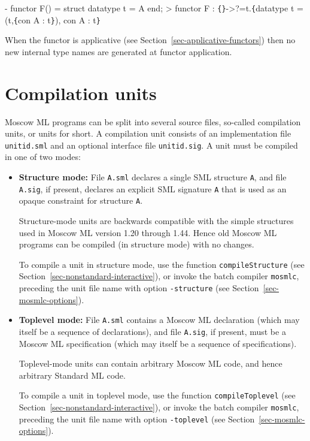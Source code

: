 \documentclass[fleqn,a4paper]{article}
\begin{document}
\begin{program}
- functor F() = struct datatype t = A end;
> functor F : \verb+{+\verb+}+->?=t.\verb+{+datatype t = (t,\verb+{+con A : t\verb+}+), con A : t\verb+}+
\end{program}

\noindent When the functor is applicative (see
Section~\ref{sec-applicative-functors}) then no new internal type
names are generated at functor application.

\newpage
\section{Compilation units}
\label{sec-compilation-units}

Moscow ML programs can be split into several source files, so-called
compilation units, or units for short.  A compilation unit consists of
an implementation file \texttt{unitid.sml} and an optional interface
file \texttt{unitid.sig}.  A unit must be compiled in one of two modes:

\begin{itemize}
\item \textbf{Structure mode:} File \texttt{A.sml} declares a single
  SML structure \texttt{A}, and file \texttt{A.sig}, if present,
  declares an explicit SML signature \texttt{A} that is used as an
  opaque constraint for structure \texttt{A}.

  
  Structure-mode units are backwards compatible with the simple
  structures used in Moscow ML version 1.20 through 1.44.  Hence old
  Moscow ML programs can be compiled (in structure mode) with no
  changes.
  
  To compile a unit in structure mode, use the function
  \texttt{compileStructure} (see
  Section~\ref{sec-nonstandard-interactive}), or invoke the batch
  compiler \texttt{mosmlc}, preceding the unit file name with option
  \texttt{-structure} (see Section~\ref{sec-mosmlc-options}).
  
\item \textbf{Toplevel mode:} File \texttt{A.sml} contains a Moscow ML
  declaration (which may itself be a sequence of declarations), and
  file \texttt{A.sig}, if present, must be a Moscow ML specification
  (which may itself be a sequence of specifications).

  Toplevel-mode units can contain arbitrary Moscow ML code, and hence
  arbitrary Standard ML code.
  
  To compile a unit in toplevel mode, use the function
  \texttt{compileToplevel} (see
  Section~\ref{sec-nonstandard-interactive}), or invoke the batch
  compiler \texttt{mosmlc}, preceding the unit file name with option
  \texttt{-toplevel} (see Section~\ref{sec-mosmlc-options}).

\end{itemize}
\end{document}
